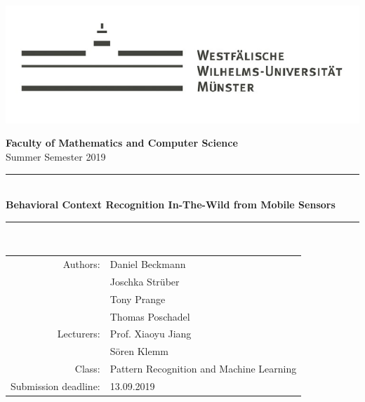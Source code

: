 \documentclass[a4paper,12pt]{scrartcl}
\begin{document}
	
	
\begin{singlespace}
\begin{titlepage}
	\begin{center}
		
		\includegraphics[scale=0.6]{wwu}
		
		\large{\textbf{\textsf{Faculty of Mathematics and Computer Science}}\\ 
			Summer Semester 2019} \\
		\vspace{20mm}
        \rule{.8\linewidth}{1pt}\\
        \vspace{3mm}
		\LARGE\textbf{\textsf{Behavioral Context Recognition In-The-Wild from Mobile Sensors}}\\
		\rule{.8\linewidth}{1pt}\\

		\vfill
	\end{center}
\begin{flushright}
	\flushright

		\begin{large}
	\singlespacing 		
		\begin{tabular}{rl}

			Authors: & Daniel Beckmann \\ & Joschka Strüber \\& Tony Prange \\& Thomas Poschadel \\
			 \midrule
			Lecturers: & Prof. Xiaoyu Jiang \\
					& Sören Klemm \\
			Class:& Pattern Recognition and Machine Learning \\
			Submission deadline: & 13.09.2019

		\end{tabular}
		\end{large}	
\end{flushright}
	

\end{titlepage}
\end{singlespace}
\end{document}
